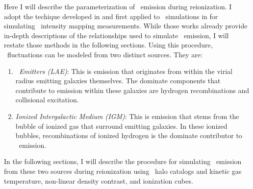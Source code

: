 Here I will describe the parameterization of \lya\ emission during reionization.
I adopt the techique developed in \cite{2013ApJ...763..132S} and first applied to \fastsim\ simulations
in \cite{2017ApJ...848...52H} for simulating \lya\ intensity mapping measurements.
While those works already provide in-depth descriptions of the relationships used to simulate
\lya\ emission, I will restate those methods in the following sections. Using this
procedure, \lya\ fluctuations can be modeled from two distinct sources. They are:

\begin{enumerate}
\item \textit{\lya\ Emitters (LAE)}: This is emission that originates from within the
              virial radius \lya\-emitting galaxies themselves. The dominate components
              that contribute to emission within these galaxies are hydrogen recombinations
              and collisional excitation.
\item \textit{Ionized Intergalactic Medium (IGM)}: This is emission that stems from the bubble
              of ionized gas that surround \lya\-emitting galaxies. In these ionized bubbles,
              recombinations of ionized hydrogen is the dominate contributor to \lya\ emission.
\end{enumerate}

In the following sections, I will describe the procedure for simulating \lya\
emission from these two sources during reionization using \fastsim\ halo catalogs
and kinetic gas temperature, non-linear density contrast, and ionization cubes.
